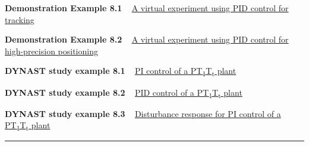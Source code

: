 \documentclass[]{article}
\begin{document}
\textbf{Demonstration Example 8.1} ~ \protect\hypertarget{16364}{}{}
\protect\hypertarget{zieglernicholsexample}{}{}
\href{http://virtual.cvut.cz/virtualexperiments/optocon.html}{A virtual
experiment using PID control for tracking}

\textbf{Demonstration Example 8.2} ~ \protect\hypertarget{16370}{}{}
\protect\hypertarget{zieglernicholsexample2}{}{}
\href{http://virtual.cvut.cz/virtualexperiments/hydraulic.html}{A
virtual experiment using PID control for high-precision positioning}

\textbf{DYNAST study example 8.1} ~ \protect\hypertarget{16376}{}{}
\protect\hypertarget{PIPT1tt}{}{}
\href{http://virtual.cvut.cz/dyn/examples/examples/control/ac3pid1/index.html}{PI
control of a PT\textsubscript{1}T\textsubscript{t} plant}

\textbf{DYNAST study example 8.2} ~ \protect\hypertarget{16382}{}{}
\protect\hypertarget{PIDPT1tt}{}{}
\href{http://virtual.cvut.cz/dyn/examples/examples/control/ac3pid2/index.html}{PID
control of a PT\textsubscript{1}T\textsubscript{t} plant}

\textbf{DYNAST study example 8.3} ~ \protect\hypertarget{16388}{}{}
\protect\hypertarget{DisturbancePIPT1tt}{}{}\href{http://virtual.cvut.cz/dyn/examples/examples/control/ac8distpi/index.html}{Disturbance
response for PI control of a PT\textsubscript{1}T\textsubscript{t}
plant}

\begin{center}\rule{0.5\linewidth}{\linethickness}\end{center}
\end{document}
